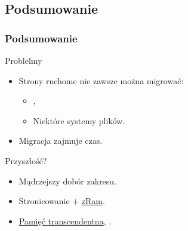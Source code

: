 \subsection{Podsumowanie}

\begin{frame}
  \frametitle{Podsumowanie}

  \begin{block}{Problelmy}
    \begin{itemize}
    \item Strony ruchome nie zawsze można migrować:
      \begin{itemize}
      \item {},
      \item Niektóre systemy plików.
      \end{itemize}
    \item Migracja zajmuje czas.
    \end{itemize}
  \end{block}

  \begin{block}{Przyszłość?}
    \begin{itemize}
    \item Mądrzejszy dobór zakresu.
    \item Stronicowanie + \href{http://code.google.com/p/compcache}{zRam}.
    \item \href{http://lwn.net/Articles/340080/}{Pamięć
      transcendentna}, \href{http://lwn.net/Articles/468896/}{}.
    \end{itemize}
  \end{block}
\end{frame}
